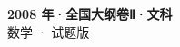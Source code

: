 \documentclass[zihao=-4, a4paper]{ctexart}
\begin{document}
\begin{center}
  {\Large\bfseries 2008 年·全国大纲卷Ⅱ·文科}\\[4pt]
  {\large 数学 · 试题版}
\end{center}
\medskip
{}

\end{document}
